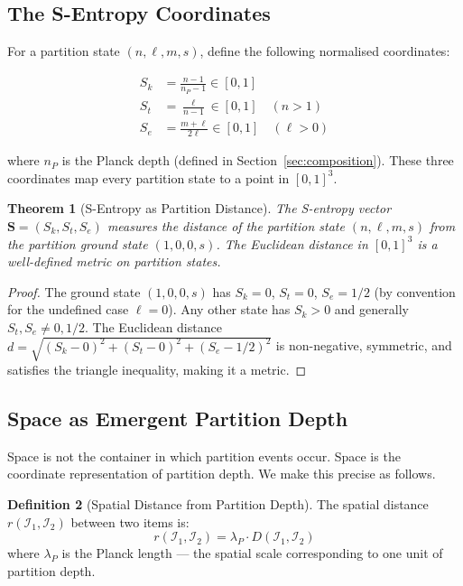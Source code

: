 \documentclass[11pt,twocolumn,a4paper]{article}
\theoremstyle{plain}
\newtheorem{theorem}{Theorem}[section]
\theoremstyle{definition}
\newtheorem{definition}[theorem]{Definition}
\theoremstyle{remark}
\begin{document}
\subsection{The S-Entropy Coordinates}
\label{subsec:sentropy}

For a partition state $(n,\ell,m,s)$, define the following normalised coordinates:

\begin{align}
    S_k &= \frac{n-1}{n_P - 1} \in [0,1]
    \label{eq:sk} \\
    S_t &= \frac{\ell}{n-1} \in [0,1] \quad (n > 1)
    \label{eq:st} \\
    S_e &= \frac{m + \ell}{2\ell} \in [0,1] \quad (\ell > 0)
    \label{eq:se}
\end{align}

where $n_P$ is the Planck depth (defined in Section~\ref{sec:composition}).
These three coordinates map every partition state to a point in $[0,1]^3$.

\begin{theorem}[S-Entropy as Partition Distance]
\label{thm:sentropy}
The S-entropy vector $\mathbf{S} = (S_k, S_t, S_e)$ measures the distance of
the partition state $(n,\ell,m,s)$ from the partition ground state $(1,0,0,s)$.
The Euclidean distance in $[0,1]^3$ is a well-defined metric on partition states.
\end{theorem}

\begin{proof}
The ground state $(1,0,0,s)$ has $S_k = 0$, $S_t = 0$, $S_e = 1/2$ (by
convention for the undefined case $\ell = 0$). Any other state has $S_k > 0$
and generally $S_t, S_e \neq 0, 1/2$. The Euclidean distance
$d = \sqrt{(S_k - 0)^2 + (S_t - 0)^2 + (S_e - 1/2)^2}$ is non-negative,
symmetric, and satisfies the triangle inequality, making it a metric.
\end{proof}

\subsection{Space as Emergent Partition Depth}
\label{subsec:space}

Space is not the container in which partition events occur. Space is the
coordinate representation of partition depth. We make this precise as follows.

\begin{definition}[Spatial Distance from Partition Depth]
\label{def:space}
The spatial distance $r(\mathcal{I}_1, \mathcal{I}_2)$ between two items is:
\begin{equation}
    r(\mathcal{I}_1, \mathcal{I}_2) = \lambda_P \cdot D(\mathcal{I}_1,
    \mathcal{I}_2)
    \label{eq:space}
\end{equation}
where $\lambda_P$ is the Planck length --- the spatial scale corresponding to
one unit of partition depth.
\end{definition}
\end{document}
